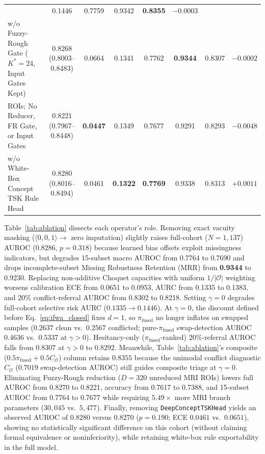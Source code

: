 \documentclass[10pt,twocolumn]{article}
\begin{document}
\begin{table}[t]
\begin{tabular}{@{}>{\raggedright\arraybackslash}p{4.8cm}ccccccc@{}}
& 0.1446 & 0.7759 & 0.9342 & \textbf{0.8355} & $-0.0003$ \\
w/o Fuzzy-Rough Gate ($K^*=24$, Input Gates Kept) & \shortstack{0.8268\\(0.8003--0.8483)} &
0.0664 & 0.1341 & 0.7762 & \textbf{0.9344} & 0.8307 & $-0.0002$ \\
320 ROIs; No Reducer, FR Gate, or Input Gates & \shortstack{0.8221\\(0.7967--0.8448)} &
\textbf{0.0447} & 0.1349 & 0.7677 & 0.9291 & 0.8293 & $-0.0048$ \\
w/o White-Box Concept TSK Rule Head & \shortstack{0.8280\\(0.8016--0.8494)} & 0.0461 &
\textbf{0.1322} & \textbf{0.7769} & 0.9338 & 0.8313 & $+0.0011$ \\
\bottomrule
\end{tabular}
\end{table}
Table~\ref{tab:ablation} dissects each operator's role. Removing exact vacuity masking
($\langle 0,0,1\rangle \to$ zero imputation) slightly raises full-cohort ($N=1,137$) AUROC
($0.8286$,
$p=0.318$) because learned bias offsets exploit missingness indicators, but degrades 15-subset
macro AUROC from 0.7764 to 0.7690 and drops incomplete-subset Missing Robustness Retention
(MRR) from \textbf{0.9344} to 0.9230. Replacing non-additive Choquet capacities with uniform
$1/|\mathcal{O}|$ weighting worsens calibration ECE from 0.0651 to 0.0953, AURC from 0.1335 to
0.1383, and 20\%
conflict-referral AUROC from 0.8302 to 0.8218. Setting $\gamma=0$ degrades full-cohort
selective risk AURC ($0.1335 \to 0.1446$). At $\gamma=0$, the discount defined before
Eq.~\eqref{eq:ifwa_closed}
fixes $d=1$, so $\pi_{\text{fused}}$ no longer inflates on swapped samples ($0.2637$ clean
vs.\ $0.2567$ conflicted; pure-$\pi_{\text{fused}}$ swap-detection AUROC $0.4636$ vs.\
$0.5337$ at $\gamma>0$). Hesitancy-only ($\pi_{\text{fused}}$-ranked) 20\%-referral AUROC
falls from $0.8307$ at $\gamma>0$ to $0.8292$. Meanwhile, Table~\ref{tab:ablation}'s
composite ($0.5\pi_{\text{fused}} + 0.5 C_{\mathcal{O}}$) column retains $0.8355$ because
the unimodal conflict diagnostic $C_{\mathcal{O}}$ ($0.7019$ swap-detection AUROC) still guides
composite triage at $\gamma=0$. Eliminating Fuzzy-Rough reduction ($D=320$ unreduced MRI ROIs)
lowers full
AUROC from 0.8270 to 0.8221, accuracy from 0.7617 to 0.7388, and 15-subset AUROC from 0.7764 to
0.7677 while requiring $5.49\times$ more MRI branch parameters ($30,045$ vs.\ $5,477$).
Finally, removing \texttt{DeepConceptTSKHead} yields an observed AUROC of $0.8280$ versus
$0.8270$ ($p=0.190$; ECE $0.0461$ vs.\ $0.0651$), showing no statistically significant
difference on this cohort (without claiming formal equivalence or noninferiority), while
retaining white-box rule exportability in the full model.
\end{document}
